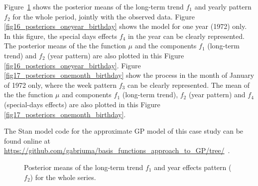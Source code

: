 %

Figure~\ref{fig15_posteriors_birthday} shows the posterior means of the long-term trend $f_1$ and yearly pattern $f_2$ for the whole period, jointly with the observed data. Figure \ref{fig16_posteriors_oneyear_birthday} shows the model for one year (1972) only. In this figure, the special days effects $f_4$ in the year can be clearly represented. The posterior means of the the function $\mu$ and the components $f_1$ (long-term trend) and $f_2$ (year pattern) are also plotted in this Figure \ref{fig16_posteriors_oneyear_birthday}. Figure \ref{fig17_posteriors_onemonth_birthday} show the process in the month of January of 1972 only, where the week pattern $f_3$ can be clearly represented. The mean of the the function $\mu$ and components $f_1$ (long-term trend), $f_2$ (year pattern) and $f_4$ (special-days effects) are also plotted in this Figure \ref{fig17_posteriors_onemonth_birthday}. 

The Stan model code for the approximate GP model of this case study can be found online at {\small \url{https://github.com/gabriuma/basis_functions_approach_to_GP/tree/}} \,.

\begin{figure}
\centering
{}
\caption{Posterior means of the long-term trend $f_1$ and year effects pattern ($f_2$) for the whole series. }
  \label{fig15_posteriors_birthday}
\end{figure}

